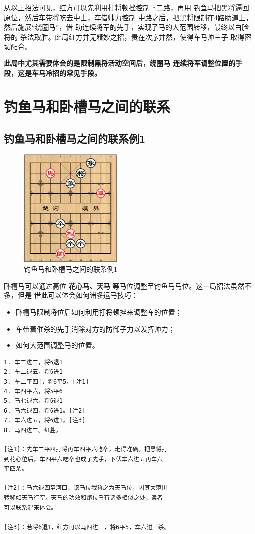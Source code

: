 \documentclass[a5paper,twoside]{book}
\begin{document}
从以上招法可见，红方可以先利用打将顿挫控制下二路，再用
钓鱼马把黑将逼回原位，然后车带将吃去中士，车借帅力控制
中路之后，把黑将限制在4路肋道上，然后施展“绕圈马”，借
助连续将军的先手，实现了马的大范围转移，最终以白脸将的
杀法取胜。此局红方并无精妙之招，贵在次序井然，使得车马帅三子
取得密切配合。

\textbf{此局中尤其需要体会的是限制黑将活动空间后，绕圈马
连续将军调整位置的手段，这是车马冷招的常见手段。}


\section{钓鱼马和卧槽马之间的联系}
\label{sec-3-5}
\subsection{钓鱼马和卧槽马之间的联系例1}
\label{sec-3-5-1}
\begin{figure}[H]
\centering
\includegraphics[width=5cm]{pic/卧槽马和钓鱼马之间的联系.png}
\caption{钓鱼马和卧槽马之间的联系例1}
\end{figure}


卧槽马可以通过高位 \textbf{花心马、天马} 等马位调整至钓鱼马马位。这一局招法虽然不多，但是
借此可以体会如何诸多运马技巧：
\begin{itemize}
\item 卧槽马限制将位后如何利用打将顿挫来调整车的位置；
\item 车带着催杀的先手消除对方的防御子力以发挥帅力；
\item 如何大范围调整马的位置。
\end{itemize}

\begin{verbatim}
1. 车二进二，将6退1
2. 车二退五，将6进1
3. 车二平四!，将6平5。[注1]
4. 车四平六，将5平6
5. 马七退六，将6退1
6. 马六退四，将6进1。[注2]
7. 车六进五，将6进1。[注3]
8. 马四进二。红胜。
   
[注1]：先车二平四打将再车四平六吃卒，走得准确。把黑将打
到花心位后，车四平六吃卒也成了先手，下伏车六进五再车六
平四杀。

[注2]：马六退四至河口，该马位我称之为天马位，因其大范围
转移如天马行空。天马的功效和炮位马有诸多相似之处，读者
可以联系起来体会。

[注3]：若将6退1，红方可以马四进三，将6平5，车六进一杀。
\end{verbatim}
\end{document}

